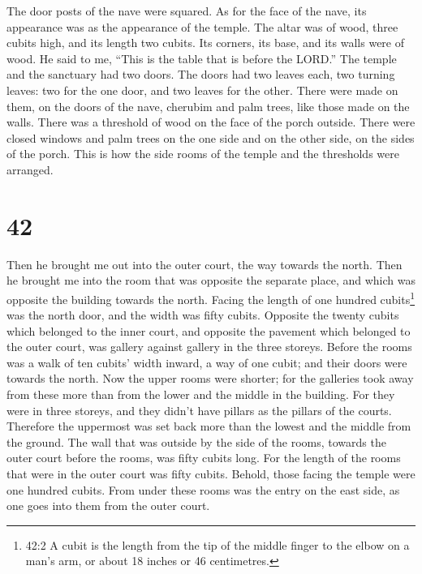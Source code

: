  The door posts of the nave were squared. As for the face
of the nave, its appearance was as the appearance of the temple.
 The altar was of wood, three cubits high, and its length
two cubits. Its corners, its base, and its walls were of wood. He said
to me, ``This is the table that is before the LORD.''  The
temple and the sanctuary had two doors.  The doors had two
leaves each, two turning leaves: two for the one door, and two leaves
for the other.  There were made on them, on the doors of
the nave, cherubim and palm trees, like those made on the walls. There
was a threshold of wood on the face of the porch outside. 
There were closed windows and palm trees on the one side and on the
other side, on the sides of the porch. This is how the side rooms of the
temple and the thresholds were arranged.

\hypertarget{section-40}{%
\section{42}\label{section-40}}

 Then he brought me out into the outer court, the way
towards the north. Then he brought me into the room that was opposite
the separate place, and which was opposite the building towards the
north.  Facing the length of one hundred cubits\footnote{42:2
  A cubit is the length from the tip of the middle finger to the elbow
  on a man's arm, or about 18 inches or 46 centimetres.} was the north
door, and the width was fifty cubits.  Opposite the twenty
cubits which belonged to the inner court, and opposite the pavement
which belonged to the outer court, was gallery against gallery in the
three storeys.  Before the rooms was a walk of ten cubits'
width inward, a way of one cubit; and their doors were towards the
north.  Now the upper rooms were shorter; for the galleries
took away from these more than from the lower and the middle in the
building.  For they were in three storeys, and they didn't
have pillars as the pillars of the courts. Therefore the uppermost was
set back more than the lowest and the middle from the ground.
 The wall that was outside by the side of the rooms, towards
the outer court before the rooms, was fifty cubits long. 
For the length of the rooms that were in the outer court was fifty
cubits. Behold, those facing the temple were one hundred cubits.
 From under these rooms was the entry on the east side, as
one goes into them from the outer court.

